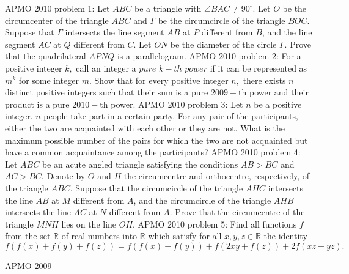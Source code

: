 APMO 2010 problem 1:  Let $ABC$ be a triangle with $\angle BAC \neq 90^{\circ}.$ Let $O$ be the circumcenter of the triangle $ABC$ and $\Gamma$ be the circumcircle of the triangle $BOC.$ Suppose that $\Gamma$ intersects the line segment $AB$ at $P$ different from $B$, and the line segment $AC$ at $Q$ different from $C.$ Let $ON$ be the diameter of the circle $\Gamma.$ Prove that the quadrilateral $APNQ$ is a parallelogram. 
APMO 2010 problem 2:  For a positive integer $k,$ call an integer a $pure$ $k-th$ $power$ if it can be represented as $m^k$ for some integer $m.$ Show that for every positive integer $n,$ there exists $n$ distinct positive integers such that their sum is a pure $2009-$th power and their product is a pure $2010-$th power. 
APMO 2010 problem 3:  Let $n$ be a positive integer. $n$ people take part in a certain party. For any pair of the participants, either the two are acquainted with each other or they are not. What is the maximum possible number of the pairs for which the two are not acquainted but have a common acquaintance among the participants? 
APMO 2010 problem 4:  Let $ABC$ be an acute angled triangle satisfying the conditions $AB>BC$ and $AC>BC$. Denote by $O$ and $H$ the circumcentre and orthocentre, respectively, of the triangle $ABC.$ Suppose that the circumcircle of the triangle $AHC$ intersects the line $AB$ at $M$ different from $A$, and the circumcircle of the triangle $AHB$ intersects the line $AC$ at $N$ different from $A.$ Prove that the circumcentre of the triangle $MNH$ lies on the line $OH$. 
APMO 2010 problem 5:  Find all functions $f$ from the set $\mathbb{R}$ of real numbers into $\mathbb{R}$ which satisfy for all $x, y, z \in \mathbb{R}$ the identity
\[ f(f(x)+f(y)+f(z))=f(f(x)-f(y))+f(2xy+f(z))+2f(xz-yz). \] 

APMO 2009 

